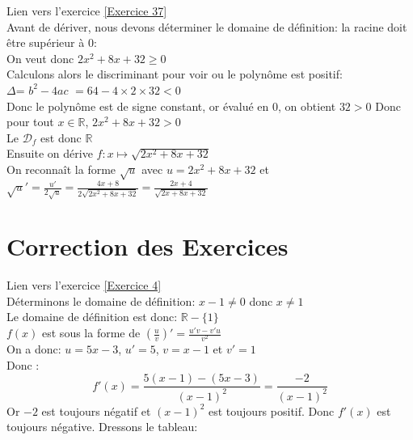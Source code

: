 \documentclass[12pt,fleqn]{report} %
\begin{document}
\begin{correction}Lien vers l'exercice   \ref{Exercice 37}\\
	Avant de dériver, nous devons déterminer le domaine de définition: la racine doit être supérieur à $0$:\\ [2mm]
	On veut donc ${2x^2+8x+32}\ge0$\\[2mm]
	Calculons alors le discriminant pour voir ou le polynôme est positif:\\ [2mm]
	$\Delta$= $b^2-4ac$ $=64-4 \times2 \times 32 < 0$\\ [2mm]
	Donc le polynôme est de signe constant, or évalué en $0$, on obtient $32>0$ Donc pour tout $x\in \mathbb{R}$, ${2x^2+8x+32}> 0$ \\[2mm]
	Le $\mathcal{D}_f$ est donc $\mathbb{R}$\\[2mm]
	Ensuite on dérive  $f :x \mapsto \sqrt{2x^2+8x+32}$\\[2mm]
	On reconnaît la forme $\sqrt{u}$ avec $u=2x^2+8x+32$ et $\sqrt{u}'= \frac{u'}{2\sqrt{u}}= \frac{4x+8}{2\sqrt{2x^2+8x+32}}=\frac{2x+4}{\sqrt{2x+8x+32}}$\\[2mm]
	\begin{center}
	\end{center}
\end{correction}



\chapter{Correction des Exercices}
\begin{correction}Lien vers l'exercice   \ref{Exercice 4}\\
	Déterminons le domaine de définition: $x-1\neq0$ donc $x\neq1$\\
	Le domaine de définition est donc: $\mathbb{R}-\lbrace 1 \rbrace$\\
	$f(x)$ est sous la forme de $\left(\frac{u}{v}\right)'= \frac{u'v-v'u}{v^2}$\\
	On a donc: $u=5x-3$, $u'=5$, $v=x-1$ et $v'=1$\\
	Donc :
	\[
	f'(x)= \frac{5(x-1)-(5x-3)}{(x-1)^2}=\frac{-2}{(x-1)^2}
	\]
	Or $-2$ est toujours négatif et $(x-1)^2$ est toujours positif. Donc $f'(x)$ est toujours négative.
	Dressons le tableau: \\
	\begin{center}
	\end{center}
\end{correction}
\end{document}
